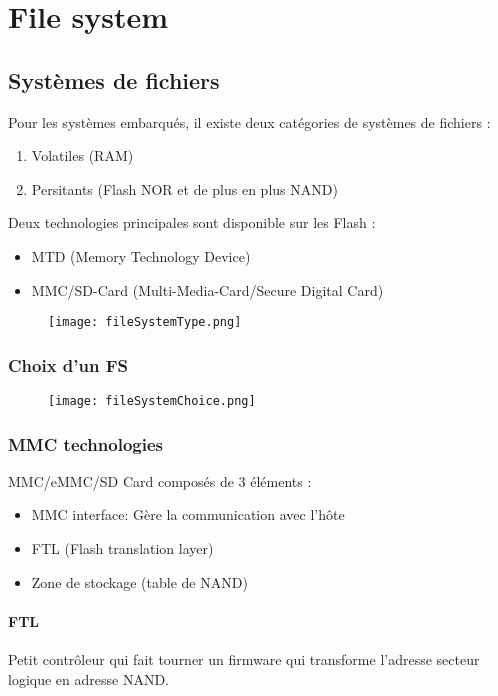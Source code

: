 \section{File system}
\subsection{Systèmes de fichiers}
Pour les systèmes embarqués, il existe deux catégories de systèmes de fichiers :
\begin{enumerate}
    \item Volatiles (RAM)
    \item Persitants (Flash NOR et de plus en plus NAND)
\end{enumerate}
Deux technologies principales sont disponible sur les Flash :
\begin{itemize}
    \item MTD (Memory Technology Device)
    \item MMC/SD-Card (Multi-Media-Card/Secure Digital Card)
\end{itemize}

\begin{figure}[H]
    \centering
    \texttt{[image: fileSystemType.png]}
\end{figure}
\subsubsection{Choix d'un FS}
\begin{figure}[H]
    \centering
    \texttt{[image: fileSystemChoice.png]}
\end{figure}
\subsubsection{MMC technologies}
MMC/eMMC/SD Card composés de 3 éléments :
\begin{itemize}
    \item MMC interface: Gère la communication avec l'hôte
    \item FTL (Flash translation layer)
    \item Zone de stockage (table de NAND)
\end{itemize}
\paragraph{FTL}
Petit contrôleur qui fait tourner un firmware qui transforme l'adresse secteur logique en adresse NAND.
